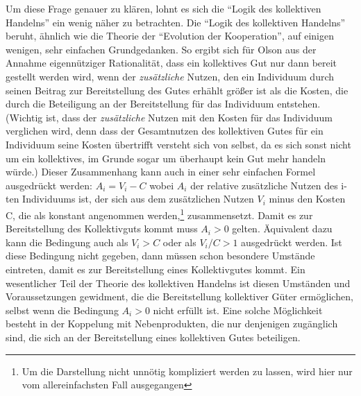 \documentclass[12pt,a4paper,ngerman]{article}
\begin{document}
Um diese Frage genauer zu klären, lohnt es sich die "`Logik des
kollektiven Handelns"' ein wenig näher zu betrachten. Die "`Logik des
kollektiven Handelns"' beruht, ähnlich wie die Theorie der "`Evolution
der Kooperation"', auf einigen wenigen, sehr einfachen
Grundgedanken. So ergibt sich für Olson aus der Annahme eigennütziger
Rationalität, dass ein kollektives Gut nur dann bereit gestellt werden
wird, wenn der {\em zusätzliche} Nutzen, den ein Individuum durch
seinen Beitrag zur Bereitstellung des Gutes erhählt größer ist als die
Kosten, die durch die Beteiligung an der Bereitstellung für das
Individuum entstehen. (Wichtig ist, dass der {\em zusätzliche} Nutzen mit
den Kosten für das Individuum verglichen wird, denn dass der
Gesamtnutzen des kollektiven Gutes für ein Individuum seine Kosten
übertrifft versteht sich von selbst, da es sich sonst nicht um ein
kollektives, im Grunde sogar um überhaupt kein Gut mehr handeln
würde.) Dieser Zusammenhang kann auch in einer sehr einfachen Formel
ausgedrückt werden: \begin{math} A_i = V_i - C \end{math} wobei 
\begin{math}A_i\end{math} der relative zusätzliche 
Nutzen des i-ten Individuums ist, der sich aus dem zusätzlichen Nutzen
\begin{math}V_i\end{math} minus den Kosten C, die als konstant
angenommen werden,\footnote{Um die Darstellung nicht unnötig
kompliziert werden zu lassen, wird hier nur vom allereinfachsten Fall
ausgegangen} zusammensetzt. Damit es zur Bereitstellung des
Kollektivguts kommt muss \begin{math}A_i > 0\end{math}
gelten. Äquivalent dazu kann die Bedingung auch als
\begin{math}V_i > C\end{math} oder als \begin{math}V_i/C > 1\end{math} 
ausgedrückt werden. Ist diese Bedingung nicht gegeben, dann müssen
schon besondere Umstände eintreten, damit es zur Bereitstellung eines
Kollektivgutes kommt. Ein wesentlicher Teil der Theorie des
kollektiven Handelns ist diesen Umständen und Voraussetzungen
gewidment, die die Bereitstellung kollektiver Güter ermöglichen,
selbst wenn die Bedingung \begin{math}A_i > 0\end{math} nicht erfüllt
ist. Eine solche Möglichkeit besteht in der Koppelung mit
Nebenprodukten, die nur denjenigen zugänglich sind, die sich an der
Bereitstellung eines kollektiven Gutes beteiligen. 
\end{document}
